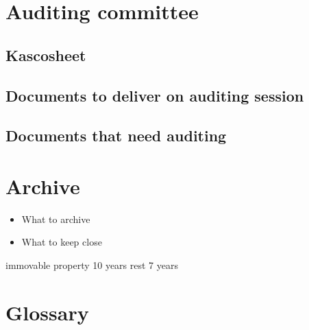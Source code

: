 \documentclass{report}
\begin{document}
\section{Auditing committee}
\subsection{Kascosheet}
\subsection{Documents to deliver on auditing session}
\subsection{Documents that need auditing}
\section{Archive}
\begin{itemize}
	\item What to archive
	\item What to keep close
\end{itemize}
immovable property 10 years
rest 7 years
\section{Glossary}
\end{document}
